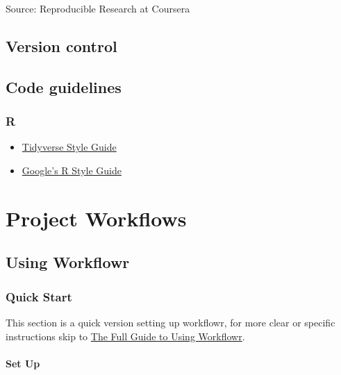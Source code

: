 \documentclass[openany]{book}
\providecommand{\tightlist}{%
  \setlength{\itemsep}{0pt}\setlength{\parskip}{0pt}}
\begin{document}
Source: Reproducible Research at Coursera

\hypertarget{version-control}{%
\section{Version control}\label{version-control}}

\hypertarget{code-guidelines}{%
\section{Code guidelines}\label{code-guidelines}}

\hypertarget{r}{%
\subsection{R}\label{r}}

\begin{itemize}
\tightlist
\item
  \href{https://style.tidyverse.org}{Tidyverse Style Guide}
\item
  \href{https://google.github.io/styleguide/Rguide.xml}{Google's R Style Guide}
\end{itemize}

\hypertarget{workflows}{%
\chapter{Project Workflows}\label{workflows}}

\hypertarget{using-workflowr}{%
\section{Using Workflowr}\label{using-workflowr}}

\hypertarget{quick-start}{%
\subsection{Quick Start}\label{quick-start}}

This section is a quick version setting up workflowr, for more clear or specific instructions skip to \protect\hyperlink{the-full-guide-to-using-workflowr}{The Full Guide to Using Workflowr}.

\hypertarget{set-up}{%
\subsubsection{Set Up}\label{set-up}}
\end{document}
